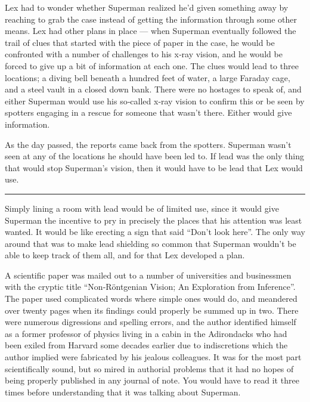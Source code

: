 Lex had to wonder whether Superman realized he'd given something away by
reaching to grab the case instead of getting the information through
some other means. Lex had other plans in place --- when Superman
eventually followed the trail of clues that started with the piece of
paper in the case, he would be confronted with a number of challenges to
his x‐ray vision, and he would be forced to give up a bit of information
at each one. The clues would lead to three locations; a diving bell
beneath a hundred feet of water, a large Faraday cage, and a steel vault
in a closed down bank. There were no hostages to speak of, and either
Superman would use his so‐called x‐ray vision to confirm this or be seen
by spotters engaging in a rescue for someone that wasn't there. Either
would give information.

As the day passed, the reports came back from the spotters. Superman
wasn't seen at any of the locations he should have been led to. If lead
was the only thing that would stop Superman's vision, then it would have
to be lead that Lex would use.

\begin{center}\rule{0.5\linewidth}{0.5pt}\end{center}

Simply lining a room with lead would be of limited use, since it would
give Superman the incentive to pry in precisely the places that his
attention was least wanted. It would be like erecting a sign that said
``Don't look here''. The only way around that was to make lead shielding
so common that Superman wouldn't be able to keep track of them all, and
for that Lex developed a plan.

A scientific paper was mailed out to a number of universities and
businessmen with the cryptic title ``Non‐Röntgenian Vision; An
Exploration from Inference''. The paper used complicated words where
simple ones would do, and meandered over twenty pages when its findings
could properly be summed up in two. There were numerous digressions and
spelling errors, and the author identified himself as a former professor
of physics living in a cabin in the Adirondacks who had been exiled from
Harvard some decades earlier due to indiscretions which the author
implied were fabricated by his jealous colleagues. It was for the most
part scientifically sound, but so mired in authorial problems that it
had no hopes of being properly published in any journal of note. You
would have to read it three times before understanding that it was
talking about Superman.

